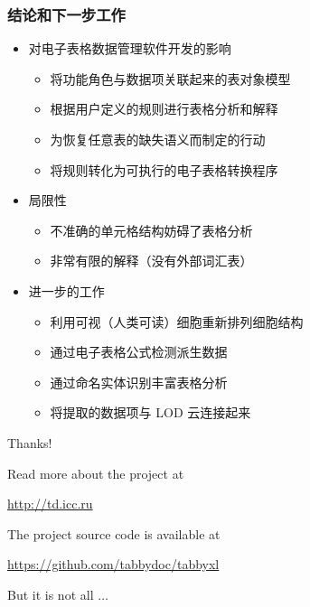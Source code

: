 \documentclass[10pt]{beamer}
\begin{document}
\begin{frame}
\frametitle{结论和下一步工作}

\begin{itemize}
\item 对电子表格数据管理软件开发的影响
\begin{itemize}
\item 将功能角色与数据项关联起来的表对象模型
\item 根据用户定义的规则进行表格分析和解释
\item 为恢复任意表的缺失语义而制定的行动
\item 将规则转化为可执行的电子表格转换程序
\end{itemize}
\medskip
\item 局限性
\begin{itemize}
\item 不准确的单元格结构妨碍了表格分析
\item 非常有限的解释（没有外部词汇表）
\end{itemize}
\medskip
\item 进一步的工作
\begin{itemize}
\item 利用可视（人类可读）细胞重新排列细胞结构
\item 通过电子表格公式检测派生数据
\item 通过命名实体识别丰富表格分析
\item 将提取的数据项与 LOD 云连接起来
\end{itemize}
\end{itemize}

\end{frame}


% 
% 

\begin{frame}
\Huge{\centerline{Thanks!}}
\bigskip
\footnotesize{\centerline{Read more about the project at}}
\scriptsize{\centerline{\url{http://td.icc.ru}}}

\bigskip
\footnotesize{\centerline{The project source code is available at}}
\scriptsize{\centerline{\url{https://github.com/tabbydoc/tabbyxl}}}
\bigskip
\begin{center}
  \Large But it is not all $\ldots$
\end{center}
\end{frame}
\end{document}
